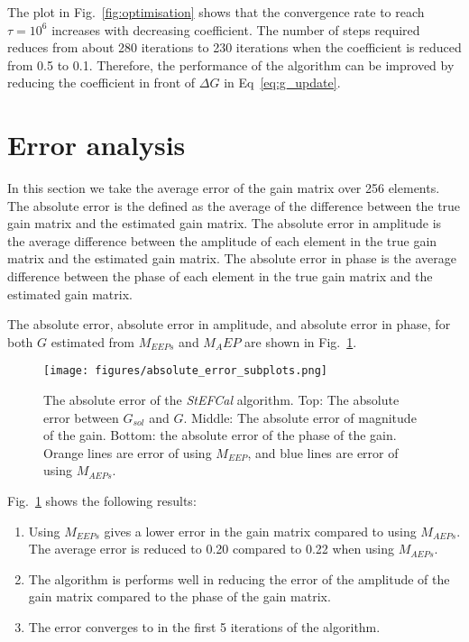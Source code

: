 \documentclass[10pt,a4paper,twocolumn]{article}
\begin{document}
The plot in Fig.~\ref{fig:optimisation} shows that the convergence rate to reach $\tau = 10^6$ increases with decreasing coefficient. The number of steps required reduces from about 280 iterations to 230 iterations when the coefficient is reduced from 0.5 to 0.1. Therefore, the performance of the algorithm can be improved by reducing the coefficient in front of $\Delta G$ in Eq~\ref{eq:g_update}.

\section{Error analysis}

In this section we take the average error of the gain matrix over 256 elements. The absolute error is the defined as the average of the difference between the true gain matrix and the estimated gain matrix. The absolute error in amplitude is the average difference between the amplitude of each element in the true gain matrix and the estimated gain matrix. The absolute error in phase is the average difference between the phase of each element in the true gain matrix and the estimated gain matrix.

The absolute error, absolute error in amplitude, and absolute error in phase, for both $G$ estimated from $M_{EEPs}$ and $M_AEP$ are shown in Fig.~\ref{fig:absolute_error_subplots}. 

\begin{figure}[H]
    \centering
    \texttt{[image: figures/absolute\_error\_subplots.png]}
    \caption{The absolute error of the \textit{StEFCal} algorithm. Top: The absolute error between $G_{sol}$ and $G$. Middle: The absolute error of magnitude of the gain. Bottom: the absolute error of the phase of the gain. Orange lines are error of using $M_{EEP}$, and blue lines are error of using $M_{AEPs}$.}
    \label{fig:absolute_error_subplots}
\end{figure}

Fig.~\ref{fig:absolute_error_subplots} shows the following results:

\begin{enumerate}
    \item Using $M_{EEPs}$ gives a lower error in the gain matrix compared to using $M_{AEPs}$. The average error is reduced to 0.20 compared to 0.22 when using $M_{AEPs}$.
    \item The algorithm is performs well in reducing the error of the amplitude of the gain matrix compared to the phase of the gain matrix.
    \item The error converges to in the first 5 iterations of the algorithm.
\end{enumerate}
\end{document}
